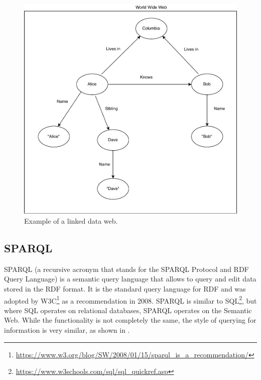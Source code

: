 \begin{figure}[htbp!]
    \centering
    \includegraphics[width=\textwidth]{images/linked-data.pdf}
    \caption{Example of a linked data web.}
    \label{fig:LinkedData}
\end{figure}

\subsection{SPARQL}\label{ssec:sparql}
SPARQL \cite{world2013sparql} (a recursive acronym that stands for the SPARQL Protocol and RDF Query Language) is a semantic query language that allows to query and edit data stored in the RDF format. It is the standard query language for RDF and was adopted by W3C\footnote{\url{https://www.w3.org/blog/SW/2008/01/15/sparql_is_a_recommendation/}} as a recommendation in 2008. SPARQL is similar to SQL\footnote{\url{https://www.w3schools.com/sql/sql_quickref.asp}}, but where SQL operates on relational databases, SPARQL operates on the Semantic Web. While the functionality is not completely the same, the style of querying for information is very similar, as shown in .

